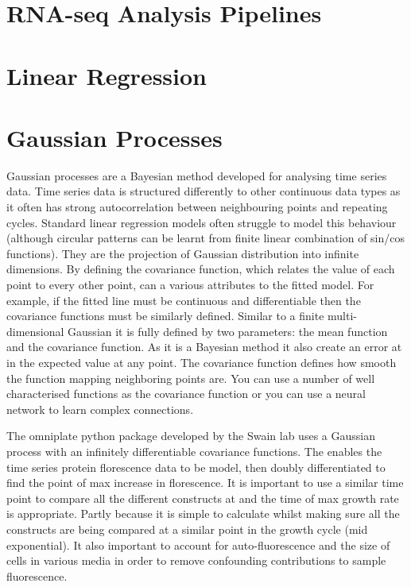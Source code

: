 \documentclass{SBCbookchapter}
\begin{document}
\section{RNA-seq Analysis Pipelines}

\section{Linear Regression}

\section{Gaussian Processes}
Gaussian processes are a Bayesian method developed for analysing time series data. Time series data is structured differently to other continuous data types as it often has strong autocorrelation between neighbouring points and repeating cycles. Standard linear regression models often struggle to model this behaviour (although circular patterns can be learnt from finite linear combination of sin/cos functions). They are the projection of Gaussian distribution into infinite dimensions. By defining the covariance function, which relates the value of each point to every other point, can a various attributes to the fitted model. For example, if the fitted line must be continuous and differentiable then the covariance functions must be similarly defined. Similar to a finite multi-dimensional Gaussian it is fully defined by two parameters:  the mean function and the covariance function. As it is a Bayesian method it also create an error at in the expected value at any point. The covariance function defines how smooth the function mapping neighboring points are. You can use a number of well characterised functions as the covariance function or you can use a neural network to learn complex connections. 

The omniplate python package developed by the Swain lab uses a Gaussian process with an infinitely differentiable covariance functions. The enables the time series protein florescence data to be model, then doubly differentiated to find the point of max increase in florescence. It is important to use a similar time point to compare all the different constructs at and the time of max growth rate is appropriate. Partly because it is simple to calculate whilst making sure all the constructs are being compared at a similar point in the growth cycle (mid exponential). It also important to account for auto-fluorescence and the size of cells in various media in order to remove confounding contributions to sample fluorescence.
\end{document}
